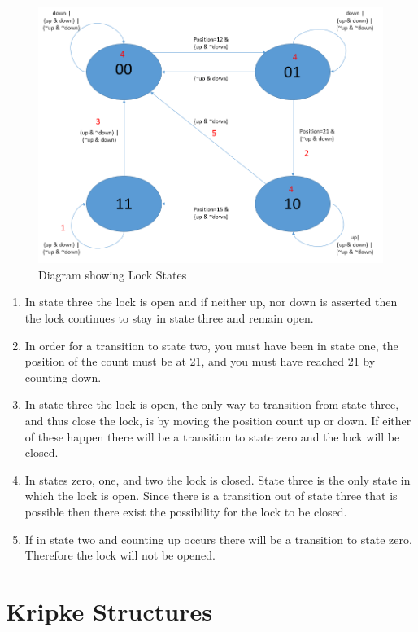 \documentclass[11pt]{article}
\begin{document}
	\begin{figure}[h]\centering
	\includegraphics[height=0.45\textwidth]{images/p1_proof.png}
	\caption{Diagram showing Lock States}
		\label{p1_p}
	\end{figure}

\begin{enumerate}
\item In state three the lock is open and if neither up, nor down is asserted then the lock continues to stay in state three and remain open.
\item In order for a transition to state two, you must have been in state one, the position of the count must be at 21, and you must have reached 21 by counting down.
\item In state three the lock is open, the only way to transition from state three, and thus close the lock, is by moving the position count up or down. If either of these happen there will be a transition to state zero and the lock will be closed.
\item In states zero, one, and two the lock is closed. State three is the only state in which the lock is open. Since there is a transition out of state three that is possible then there exist the possibility for the lock to be closed.
\item If in state two and counting up occurs there will be a transition to state zero. Therefore the lock will not be opened. 
\end{enumerate}	

	

\section{Kripke Structures} 
\end{document}
